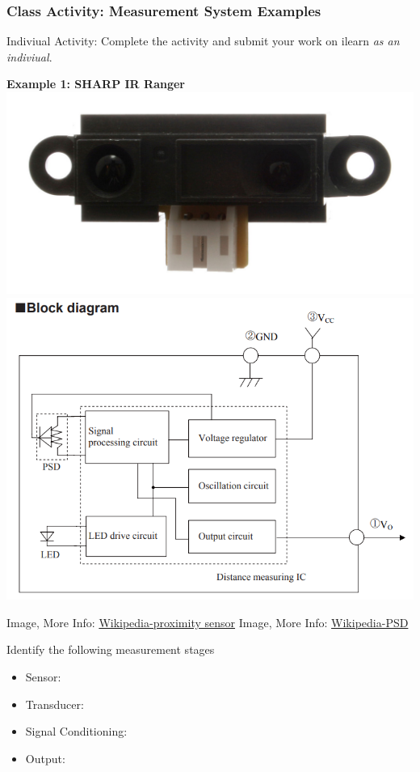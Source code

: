 \documentclass[fleqn]{beamer} %
\newcommand{\sectionIIsubsectionVtitle}{Class Activity: Measurement System Examples}
\begin{document}
			\begin{frame}
				\frametitle{\sectionIIsubsectionVtitle}
				\tiny

				Indiviual Activity: Complete the activity and submit your work on ilearn {\it as an indiviual}.

				\begin{multicols}{2}

				\textbf{Example 1: SHARP IR Ranger } \vspc
				\includegraphics[scale=0.4]{images/proximity_sensor.jpg}
				\includegraphics[scale=0.18]{images/sharp_ranger_circuit.png} \vspc

				{\tiny Image, More Info: \href{https://en.wikipedia.org/wiki/Proximity_sensor}{Wikipedia-proximity sensor} }\hspace{40mm} 
				{\tiny Image, More Info: \href{https://en.wikipedia.org/wiki/Position_sensitive_device}{Wikipedia-PSD} }		


				Identify the following measurement stages 
				\begin{itemize}
				\item Sensor: \hspcu
				\item Transducer: \hspcu
				\item Signal Conditioning: \hspcu
				\item Output: \hspcu
				\end{itemize}


\end{multicols}
\end{frame}
\end{document}

